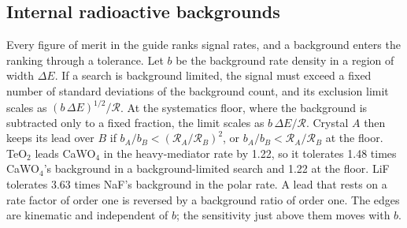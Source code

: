 \subsection{Internal radioactive backgrounds}\label{sec:21.7-backgrounds}

Every figure of merit in the guide ranks signal rates, and a background enters the ranking through a tolerance. Let $b$ be the background rate density in a region of width $\Delta E$. If a search is background limited, the signal must exceed a fixed number of standard deviations of the background count, and its exclusion limit scales as $(b\,\Delta E)^{1/2}/\mathcal{R}$. At the systematics floor, where the background is subtracted only to a fixed fraction, the limit scales as $b\,\Delta E/\mathcal{R}$. Crystal $A$ then keeps its lead over $B$ if $b_A/b_B < (\mathcal{R}_A/\mathcal{R}_B)^2$, or $b_A/b_B < \mathcal{R}_A/\mathcal{R}_B$ at the floor. TeO$_2$ leads CaWO$_4$ in the heavy-mediator rate by 1.22, so it tolerates 1.48 times CaWO$_4$'s background in a background-limited search and 1.22 at the floor. LiF tolerates 3.63 times NaF's background in the polar rate. A lead that rests on a rate factor of order one is reversed by a background ratio of order one. The edges are kinematic and independent of $b$; the sensitivity just above them moves with $b$.

